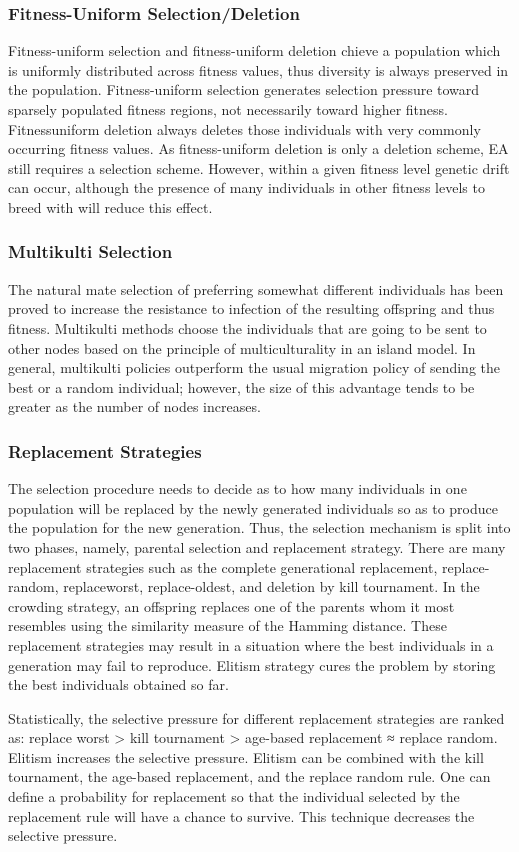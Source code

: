 \documentclass[14pt]{article}
\numberwithin{equation}{subsection}
\begin{document}
			\subsubsection{Fitness-Uniform Selection/Deletion}Fitness-uniform selection and fitness-uniform deletion chieve
			a population which is uniformly distributed across fitness values, thus diversity is always preserved in the
			population. Fitness-uniform selection generates selection pressure toward sparsely populated fitness regions,
			not necessarily toward higher fitness. Fitnessuniform deletion always deletes those individuals with very
			commonly occurring fitness values. As fitness-uniform deletion is only a deletion scheme, EA still requires
			a selection scheme. However, within a given fitness level genetic drift can occur, although the presence of
			many individuals in other fitness levels to breed with will reduce this effect.
			
			\subsubsection{Multikulti Selection}The natural mate selection of preferring somewhat different individuals has
			been proved to increase the resistance to infection of the resulting offspring and thus fitness. Multikulti
			methods choose the individuals that are going to be sent to other nodes based on the principle of
			multiculturality in an island model. In general, multikulti policies outperform the usual migration policy of
			sending the best or a random individual; however, the size of this advantage tends to be greater as the
			number of nodes increases.
			
			\subsubsection{Replacement Strategies}The selection procedure needs to decide as to how many individuals in one
			population will be replaced by the newly generated individuals so as to produce the population for the new
			generation. Thus, the selection mechanism is split into two phases, namely, parental selection and
			replacement strategy. There are many replacement strategies such as the complete generational replacement,
			replace-random, replaceworst, replace-oldest, and deletion by kill tournament. In the crowding strategy, an
			offspring replaces one of the parents whom it most resembles using the similarity measure of the Hamming
			distance. These replacement strategies may result in a situation where the best individuals in a generation
			may fail to reproduce. Elitism strategy cures the problem by storing the best individuals obtained so far. \par
			Statistically, the selective pressure for different replacement strategies are ranked as: replace worst >
			kill tournament > age-based replacement ≈ replace random. Elitism increases the selective pressure. Elitism
			can be combined with the kill tournament, the age-based replacement, and the replace random rule. One can
			define a probability for replacement so that the individual selected by the replacement rule will have a
			chance to survive. This technique decreases the selective pressure.
			
\end{document}
